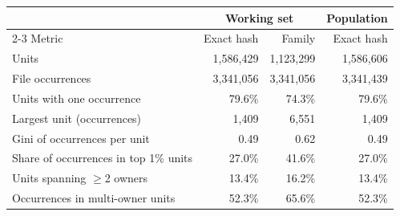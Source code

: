 \begin{tabular}{lrrr}
\toprule
 & \multicolumn{2}{c}{Working set} & Population \\
\cmidrule(lr){2-3}
Metric & Exact hash & Family & Exact hash \\
\midrule
Units & 1,586,429 & 1,123,299 & 1,586,606 \\
File occurrences & 3,341,056 & 3,341,056 & 3,341,439 \\
Units with one occurrence & 79.6\% & 74.3\% & 79.6\% \\
Largest unit (occurrences) & 1,409 & 6,551 & 1,409 \\
Gini of occurrences per unit & 0.49 & 0.62 & 0.49 \\
Share of occurrences in top 1\% units & 27.0\% & 41.6\% & 27.0\% \\
Units spanning $\geq$2 owners & 13.4\% & 16.2\% & 13.4\% \\
Occurrences in multi-owner units & 52.3\% & 65.6\% & 52.3\% \\
\bottomrule
\end{tabular}
